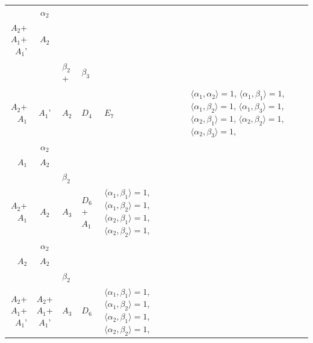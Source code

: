 \documentclass[12pt]{report}
\begin{document}
\begin{appendix}
{\begin{longtable}{rcl p{1cm}p{1cm}p{3cm} }
\begin{tabular}{cc}$\alpha_1$+ & $\alpha_2$\\\tiny{ $A_2$+$A_1$+$A_1$' } & \tiny{ $A_2$ }\end{tabular} &\begin{tabular}{c} = \\~ \end{tabular} & \begin{tabular}{ccc}$\beta_1$+ & $\beta_2$+ & $\beta_3$\\\tiny{ $A_2$+$A_1$ } & \tiny{ $A_1$' } & \tiny{ $A_2$ }\end{tabular} & $D_4$ & $E_7$ & $\langle\alpha_1, \alpha_2\rangle=1$,  $\langle\alpha_1, \beta_1\rangle=1$, $\langle\alpha_1, \beta_2\rangle=1$, $\langle\alpha_1, \beta_3\rangle=1$, $\langle\alpha_2, \beta_1\rangle=1$, $\langle\alpha_2, \beta_2\rangle=1$, $\langle\alpha_2, \beta_3\rangle=1$, 
\\
\begin{tabular}{cc}$\alpha_1$+ & $\alpha_2$\\\tiny{ $A_1$ } & \tiny{ $A_2$ }\end{tabular} &\begin{tabular}{c} = \\~ \end{tabular} & \begin{tabular}{cc}$\beta_1$+ & $\beta_2$\\\tiny{ $A_2$+$A_1$ } & \tiny{ $A_2$ }\end{tabular} & $A_3$ & $D_6$+$A_1$ &  $\langle\alpha_1, \beta_1\rangle=1$, $\langle\alpha_1, \beta_2\rangle=1$, $\langle\alpha_2, \beta_1\rangle=1$, $\langle\alpha_2, \beta_2\rangle=1$, 
\\
\begin{tabular}{cc}$\alpha_1$+ & $\alpha_2$\\\tiny{ $A_2$ } & \tiny{ $A_2$ }\end{tabular} &\begin{tabular}{c} = \\~ \end{tabular} & \begin{tabular}{cc}$\beta_1$+ & $\beta_2$\\\tiny{ $A_2$+$A_1$+$A_1$' } & \tiny{ $A_2$+$A_1$+$A_1$' }\end{tabular} & $A_3$ & $D_6$ &  $\langle\alpha_1, \beta_1\rangle=1$, $\langle\alpha_1, \beta_2\rangle=1$, $\langle\alpha_2, \beta_1\rangle=1$, $\langle\alpha_2, \beta_2\rangle=1$, 
\\

\end{longtable}}
\end{appendix}
\end{document}
